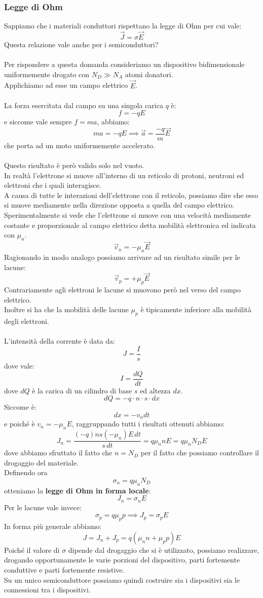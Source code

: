 \documentclass[../main.tex]{subfiles}
\begin{document}
	\subsubsection{Legge di Ohm}
	Sappiamo che i materiali conduttori rispettano la legge di Ohm per cui vale:
	$$\vec{J} = \sigma \vec{E}$$
	Questa relazione vale anche per i semiconduttori?\\\\
	Per rispondere a questa domanda consideriamo un dispositivo bidimensionale uniformemente drogato con $N_D \gg N_A$ atomi donatori. \\
	Applichiamo ad esse un campo elettrico $\vec{E}$.\\\\
	La forza esercitata dal campo su una singola carica $q$ è:
	$$f = -qE$$
	e siccome vale sempre $f = ma$, abbiamo:
	$$ma = -qE \implies \vec{a} = \frac{-q}{m} \vec{E}$$
	che porta ad un moto uniformemente accelerato.\\\\
	Questo risultato è però valido solo nel vuoto. \\
	In realtà l’elettrone si muove all’interno di un reticolo di protoni, neutroni ed elettroni che i quali interagisce. \\
	A causa di tutte le interazioni dell’elettrone con il reticolo, possiamo dire che esso si muove mediamente nella direzione opposta a quella del campo elettrico. \\
	Sperimentalmente si vede che l’elettrone si muove con una velocità mediamente costante e proporzionale al campo elettrico detta mobilità elettronica ed indicata con $\mu_n$.
	$$\vec{v}_n = -\mu_n \vec{E}$$
	Ragionando in modo analogo possiamo arrivare ad un risultato simile per le lacune:
	$$\vec{v}_p = +\mu_p \vec{E}$$
	Contrariamente agli elettroni le lacune si muovono però nel verso del campo elettrico. \\
	Inoltre si ha che la mobilità delle lacune $\mu_p$ è tipicamente inferiore alla mobilità degli elettroni.\\\\
	L’intensità della corrente è data da:
	$$J = \frac{I}{s}$$
	dove vale:
	$$I = \frac{dQ}{dt}$$
	dove $dQ$ è la carica di un cilindro di base $s$ ed altezza $dx$.
	$$dQ = -q \cdot n \cdot s \cdot dx$$
	Siccome è:
	$$dx = -v_n dt$$
	e poiché è $v_n = -\mu_n E$, raggruppando tutti i risultati ottenuti abbiamo:
	$$J_n = \frac{(-q)ns(-\mu_n)E \, dt}{s \, dt} = q\mu_n nE = q\mu_n N_D E$$
	dove abbiamo sfruttato il fatto che $n = N_D$ per il fatto che possiamo controllare il drogaggio del materiale. \\
	Definendo ora
	$$\sigma_n = q\mu_n N_D$$
	otteniamo la \textbf{legge di Ohm in forma locale}:
	$$J_n = \sigma_n E$$
	Per le lacune vale invece:
	$$\sigma_p = q\mu_p p \implies J_p = \sigma_p E$$
	In forma più generale abbiamo:
	$$J = J_n + J_p = q(\mu_n n + \mu_p p)E$$
	Poiché il valore di $\sigma$ dipende dal drogaggio che si è utilizzato, possiamo realizzare, drogando opportunamente le varie porzioni del dispositivo, parti fortemente conduttive e parti fortemente resistive. \\
	Su un unico semiconduttore possiamo quindi costruire sia i dispositivi sia le connessioni tra i dispositivi.
\end{document}
